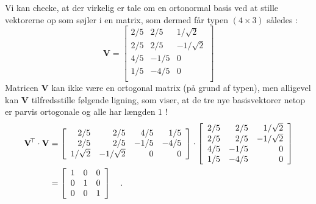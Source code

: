 \begin{example}
Vi kan checke, at der virkelig er tale om en ortonormal basis ved at stille vektorerne op som søjler i en matrix, som dermed får typen $(4 \times 3)$ således :
\begin{equation}
\mathbf{V} =  \left[
            \begin{array}{rrr}
             {2}/{5} & {2}/{5} & {1}/{\sqrt{2}} \\
              {2}/{5} & {2}/{5} & -{1}/{\sqrt{2}} \\
              {4}/{5} & -{1}/{5} & 0 \\
             {1}/{5} & -{4}/{5} & 0 \\
            \end{array}
          \right]
\end{equation}
Matricen $\mathbf{V}$ kan ikke være en ortogonal matrix (på grund af typen), men alligevel kan $\mathbf{V}$ tilfredsstille følgende ligning, som viser, at de tre nye basisvektorer netop er parvis ortogonale og alle har længden $1$ !
\begin{equation}
\begin{aligned}
\mathbf{V}\hspace*{-.6mm}^{\top} \cdot \mathbf{V} &=  \left[
                          \begin{array}{rrrr}
                            2/5 & 2/5 & 4/5 & 1/5 \\
                            2/5 & 2/5 & -1/5 & -4/5 \\
                            1/\sqrt{2} & -1/\sqrt{2} & 0 & 0 \\
                          \end{array}
                        \right] \cdot
            \left[
            \begin{array}{rrr}
             {2}/{5} & {2}/{5} & {1}/{\sqrt{2}} \\
              {2}/{5} & {2}/{5} & -{1}/{\sqrt{2}} \\
              {4}/{5} & -{1}/{5} & 0 \\
             {1}/{5} & -{4}/{5} & 0 \\
            \end{array}
          \right] \\
&= \left[
                      \begin{array}{rrr}
                        1 & 0 & 0 \\
                        0 & 1 & 0 \\
                        0 & 0 & 1 \\
                      \end{array}
                    \right] \quad .
\end{aligned}
\end{equation}

\end{example}


